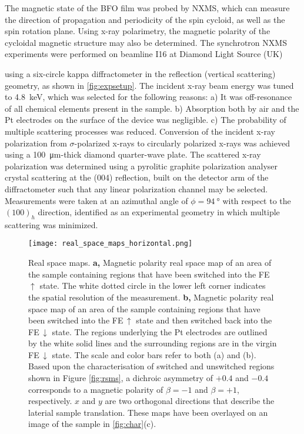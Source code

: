 \documentclass[aps,prb,twocolumn,showpacs,superscriptaddress, longbibliography, 10pt]{revtex4-1}
\begin{document}
The magnetic state of the BFO film was probed by NXMS, which can measure the direction of propagation and periodicity of the spin cycloid, as well as the spin rotation plane. Using x-ray polarimetry, the magnetic polarity of the cycloidal magnetic structure may also be determined. The synchrotron NXMS experiments were performed on beamline I16 at Diamond Light Source (UK) {using a six-circle kappa diffractometer in the reflection (vertical scattering) geometry, as shown in \cref{fig:expsetup}. The incident x-ray beam energy was tuned to \SI{4.8}{\kilo\electronvolt}, which was selected for the following reasons: a) It was off-resonance of all chemical elements present in the sample. b) Absorption both by air and the Pt electrodes on the surface of the device was negligible. c) The probability of multiple scattering processes was reduced. Conversion of the incident x-ray polarization from $\sigma$-polarized x-rays to circularly polarized x-rays was achieved using a \SI{100}{\micro\meter}-thick diamond quarter-wave plate. The scattered x-ray polarization was determined using a pyrolitic graphite polarization analyser crystal scattering at the (004) reflection, built on the detector arm of the diffractometer such that any linear polarization channel may be selected. Measurements were taken at an azimuthal angle of $\phi = \SI{94}{\degree}$ with respect to the $(100)_h$ direction, identified as an experimental geometry in which multiple scattering was minimized.

\begin{figure*}[ht]
\texttt{[image: real\_space\_maps\_horizontal.png]}
\caption{\label{fig:real_space_maps} Real space maps. \textbf{a,} Magnetic polarity real space map of an area of the sample containing regions that have been switched into the FE\,$\uparrow$ state. The white dotted circle in the lower left corner indicates the spatial resolution of the measurement. \textbf{b,} Magnetic polarity real space map of an area of the sample containing regions that have been switched into the FE\,$\uparrow$ state and then switched back into the FE\,$\downarrow$ state. The regions underlying the Pt electrodes are outlined by the white solid lines and the surrounding regions are in the virgin FE\,$\downarrow$ state. The scale and color bars refer to both (a) and (b). Based upon the characterisation of switched and unswitched regions shown in Figure \ref{fig:rsms}, a dichroic asymmetry of $+0.4$ and $-0.4$ corresponds to a magnetic polarity of $\beta=-1$ and $\beta=+1$, respectively. $x$ and $y$ are two orthogonal directions that describe the laterial sample translation. These maps have been overlayed on an image of the sample in \cref{fig:char}(c).}
\end{figure*}

}
\end{document}
